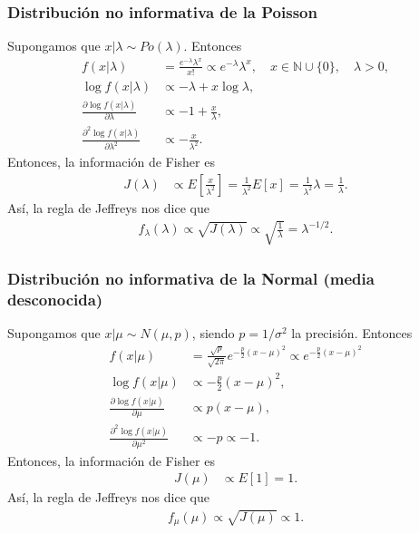 \subsubsection{Distribución no informativa de la Poisson}
Supongamos que $x | \lambda \sim Po(\lambda)$. Entonces
\begin{align*}
    f(x | \lambda)                                            & = \frac{e^{-\lambda}\lambda^x}{x!} \propto e^{-\lambda}\lambda^x, \quad x \in \mathbb{N} \cup \{0\}, \quad\lambda >0, \\
    \log f(x | \lambda)                                       & \propto -\lambda + x \log \lambda ,                                                                                   \\
    \frac{\partial \log f(x | \lambda)}{\partial \lambda}     & \propto - 1 + \frac{x}{\lambda},                                                                                      \\
    \frac{\partial^2 \log f(x | \lambda)}{\partial \lambda^2} & \propto - \frac{x}{\lambda^2} .
\end{align*}
Entonces, la información de Fisher es
\begin{align*}
    J(\lambda) & \propto E\left[ \frac{x}{\lambda^2} \right] = \frac{1}{\lambda^2}E[x] = \frac{1}{\lambda^2} \lambda = \frac{1}{\lambda}.
\end{align*}
Así, la regla de Jeffreys nos dice que
\begin{align*}
    f_{\lambda}(\lambda) \propto \sqrt{J(\lambda)} \propto \sqrt{\frac{1}{\lambda}} = \lambda^{-1/2}.
\end{align*}

\subsubsection{Distribución no informativa de la Normal (media desconocida)}
Supongamos que $x | \mu \sim N(\mu,p)$, siendo $p = 1/\sigma^2$ la precisión. Entonces
\begin{align*}
    f(x | \mu)                                        & = \frac{\sqrt{p}}{\sqrt{2\pi}}e^{-\frac{p}{2}(x-\mu)^2} \propto e^{-\frac{p}{2}(x-\mu)^2} \\
    \log f(x | \mu)                                   & \propto -\frac{p}{2}(x-\mu)^2  ,                                                          \\
    \frac{\partial \log f(x | \mu)}{\partial \mu}     & \propto p(x-\mu),                                                                         \\
    \frac{\partial^2 \log f(x | \mu)}{\partial \mu^2} & \propto -p \propto -1 .
\end{align*}
Entonces, la información de Fisher es
\begin{align*}
    J(\mu) & \propto E\left[ 1 \right] = 1.
\end{align*}
Así, la regla de Jeffreys nos dice que
\begin{align*}
    f_{\mu}(\mu) \propto \sqrt{J(\mu)} \propto 1.
\end{align*}


